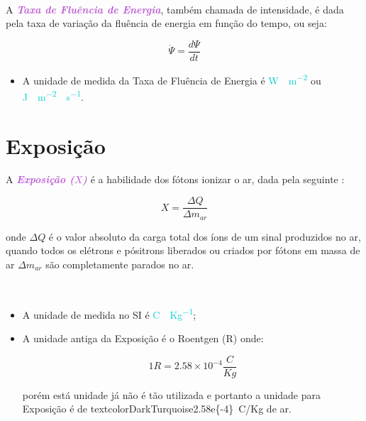 \documentclass[11pt,a4paper]{article}
\newcounter{exemplo}
\begin{document}
		\

		A \textit{\textbf{\textcolor{MediumOrchid}{Taxa de Fluência de Energia}}}, também chamada de intensidade, é dada pela taxa de variação da fluência de energia em função do tempo, ou seja:

			\begin{equation}
				\dot{\Psi} = \frac{d \Psi}{d t}
			\end{equation}
		

		\begin{exemplo}[Unidade]
			\begin{itemize}
				\item A unidade de medida da Taxa de Fluência de Energia é \textcolor{DarkTurquoise}{\unit{W \cdot m^{-2}}} ou \textcolor{DarkTurquoise}{\unit{J \cdot m^{-2} \cdot s^{-1}}}.
			\end{itemize}
			
		\end{exemplo}
		
		
	\section{Exposição}

		A \textit{\textbf{\textcolor{MediumOrchid}{Exposição ($X$)}}} é a habilidade dos fótons ionizar o ar, dada pela seguinte  :

			\begin{equation}
				X = \frac{\Delta Q}{\Delta m_{ar}}
			\end{equation}

		\noindent onde $\Delta Q$ é o valor absoluto da carga total dos íons de um sinal produzidos no ar, quando todos os elétrons e pósitrons liberados ou criados por fótons em  massa de ar $\Delta m_{ar}$ são completamente parados no ar.
		
		\
		
		\begin{exemplo}[Unidade]

			\begin{itemize}
				\item A unidade de medida no SI é \textcolor{DarkTurquoise}{\unit{C \cdot Kg^{-1}}};
				\item  A unidade antiga da Exposição é o Roentgen (R) onde:

				\begin{equation*}
					1 R = 2.58 \times 10 ^{-4}\frac{C}{Kg}
				\end{equation*}
	
			\noindent porém está unidade já não é tão utilizada e portanto a unidade para Exposição é de textcolor{DarkTurquoise}{\qty{2.58e{-4}}{C/Kg}} de ar.
			\end{itemize}
			
		\end{exemplo}
		
\end{document}
